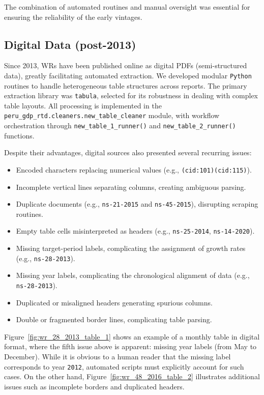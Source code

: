 \documentclass[a4paper, fleqn, 11pt]{article}
\newcommand{\pymodule}[1]{\texttt{#1}}
\newcommand{\pyfunction}[1]{\texttt{#1()}}
\begin{document}
The combination of automated routines and manual oversight was essential for ensuring the reliability of the early vintages.



\subsection{Digital Data (post-2013)}

Since 2013, WRs have been published online as digital PDFs (semi-structured data), greatly facilitating automated extraction. We developed modular \texttt{Python} routines to handle heterogeneous table structures across reports. The primary extraction library was \texttt{tabula}, selected for its robustness in dealing with complex table layouts. All processing is implemented in the \pymodule{peru\_gdp\_rtd.cleaners.new\_table\_cleaner} module, with workflow orchestration through \pyfunction{new\_table\_1\_runner} and \pyfunction{new\_table\_2\_runner} functions.

\newpage
Despite their advantages, digital sources also presented several recurring issues:
%
\begin{itemize}
    \item Encoded characters replacing numerical values (e.g., \texttt{(cid:101)(cid:115)}).
    \item Incomplete vertical lines separating columns, creating ambiguous parsing.
    \item Duplicate documents (e.g., \texttt{ns-21-2015} and \texttt{ns-45-2015}), disrupting scraping routines.
    \item Empty table cells misinterpreted as headers (e.g., \texttt{ns-25-2014}, \texttt{ns-14-2020}).
    \item Missing target-period labels, complicating the assignment of growth rates (e.g., \texttt{ns-28-2013}).
    \item Missing year labels, complicating the chronological alignment of data (e.g., \texttt{ns-28-2013}).
    \item Duplicated or misaligned headers generating spurious columns.
    \item Double or fragmented border lines, complicating table parsing.
\end{itemize}

Figure~\ref{fig:wr_28_2013_table_1} shows an example of a monthly table in digital format, where the fifth issue above is apparent: missing year labels (from May to December). While it is obvious to a human reader that the missing label corresponds to year \texttt{2012}, automated scripts must explicitly account for such cases. On the other hand, Figure~\ref{fig:wr_48_2016_table_2} illustrates additional issues such as incomplete borders and duplicated headers.
\end{document}
